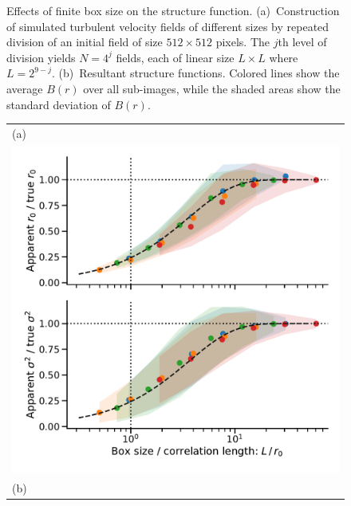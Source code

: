 \documentclass[fleqn,usenatbib, useAMS, a4paper]{mnras}
\begin{document}
\begin{figure}
\begin{tabular}{@{} l @{}}
  \end{tabular}
  \caption{Effects of finite box size on the structure function.
    (a)~Construction of simulated turbulent velocity fields of different sizes
    by repeated division of an initial field of size \(512 \times 512\) pixels.
    The \(j\)th level of division yields \(N = 4^j\) fields,
    each of linear size \(L \times L\) where \(L = 2^{9 - j}\). 
    (b)~Resultant structure functions.
    Colored lines show the average \(B(r)\) over all sub-images,
    while the shaded areas show the standard deviation of \(B(r)\).
  }
  \label{fig:finite-box}
\end{figure}

\begin{figure}
  \begin{tabular}{@{} l @{}}
    (a)\\
    \includegraphics[width=0.95\linewidth]{Figures/fake-finite-box-effect}
    \\[\bigskipamount]
    (b)\\

\end{tabular}
\end{figure}
\end{document}
